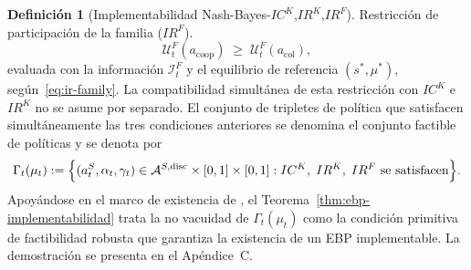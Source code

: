 \documentclass[review,authoryear,12pt]{elsarticle}
\theoremstyle{plain}
\theoremstyle{definition}
\newtheorem{definition}[theorem]{Definición}
\newcommand{\1}{\mathbf{1}}
\begin{document}
\begin{definition}[Implementabilidad Nash-Bayes-$IC^K$,$IR^K$,$IR^F$]
\smallskip
\noindent Restricción de participación de la familia \textup{(}$IR^F$\textup{)}.
\[
\mathcal{U}^F_t(a_{\mathrm{coop}})\;\ge\;\mathcal{U}^F_t(a_{\mathrm{col}}),
\]
evaluada con la información $\mathcal{I}_t^F$ y el equilibrio de referencia $(s^\ast,\mu^\ast)$, según~\eqref{eq:ir-family}.
La compatibilidad simultánea de esta restricción con $IC^K$ e $IR^K$ no se asume por separado. El conjunto de tripletes de política que satisfacen simultáneamente las tres condiciones anteriores se denomina el conjunto factible de políticas y se denota por
\begin{equation}
\label{eq:gamma-factible}
\Gamma_t(\mu_t)
:=\Bigl\{(a_t^S,\alpha_t,\gamma_t)\in
\mathcal{A}^{S,\mathrm{disc}}\times[0,1]\times[0,1] :
IC^K,\;IR^K,\;IR^F
\text{ se satisfacen}\Bigr\}.
\end{equation}
Apoyándose en el marco de existencia de \citet{KadanRenySwinkels2017}, el Teorema~\ref{thm:ebp-implementabilidad} trata la no vacuidad de $\Gamma_t(\mu_t)$ como la condición primitiva de factibilidad robusta que garantiza la existencia de un EBP implementable. La demostración se presenta en el Apéndice~C.
\end{definition}
\end{document}
